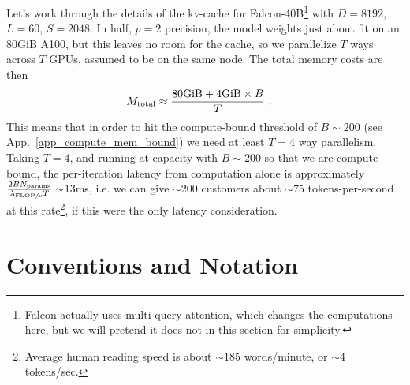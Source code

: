 \documentclass[11pt]{article}
\begin{document}
Let's work through the details of the kv-cache for Falcon-40B\footnote{Falcon actually uses
	multi-query attention, which changes the computations here, but we will pretend it does not in this
	section for simplicity.} with $ D=8192 $, $ L=60 $, $ S=2048 $.  In half, $ p=2 $ precision, the model weights just about fit on an
80GiB A100, but this leaves no room for the cache, so we parallelize $ T $ ways across $ T $ GPUs,
assumed to be on the same node. The total memory costs are then
\begin{align}
	M _{ {\rm  total} } & \approx  \frac{ {\rm 80GiB} + {\rm 4GiB}\times B }{ T } \ .
\end{align}
This means that in order to hit the compute-bound threshold of $ B \sim 200 $ (see
App.~\ref{app_compute_mem_bound}) we need at least $ T=4 $ way parallelism.  Taking $ T=4 $, and
running at capacity with $ B \sim 200$ so that we are compute-bound, the per-iteration latency from
computation alone is approximately $ \frac{2BN _{ {\rm params} } }{ \lambda _{ {\rm FLOP/s} } T} \sim
$13ms, i.e. we can give $ \sim $200 customers about $ \sim $75 tokens-per-second at this
rate\footnote{Average human reading speed is about $ \sim 185$ words/minute, or $ \sim 4
	$tokens/sec.}, if this were the only latency consideration.











\appendix



\section{Conventions and Notation\label{app_conventions}}
\end{document}
